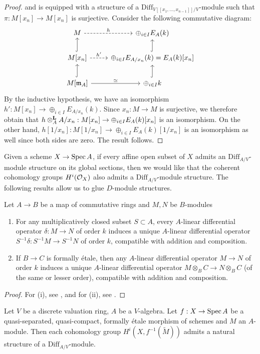 \begin{proof}
and is equipped with a structure of a $\mathrm{Diff}_{V[[x_1, \ldots, x_{n-1}]]/V}$-module such that $\pi: M[x_n] \to M[x_n]$ is surjective. Consider the following commutative diagram:
\[\begin{tikzcd}M \arrow[r, dashed, "h"] & \oplus_{i\in I} E_A(k) \\
M[x_n] \arrow[r, dashed, "h'"] \arrow[u, hook] & \oplus_{i \in I} E_{A/x_n}(k)=E_A(k)[x_n] \arrow[u, hook]\\
M[\ideal{m}_A] \arrow[r, "\simeq"] \arrow[u, hook] & \oplus_{i \in I} k \arrow[u, hook]
\end{tikzcd}\]
By the inductive hypothesis, we have an isomorphism $h': M[x_n] \to \oplus_{i \in I} E_{A/x_n}(k)$. Since $x_n: M \to M$ is surjective, we therefore
obtain that $h \otimesl_A A/x_n: M[x_n] \to \oplus_{i \in I} E_A(k)[x_n]$ is an isomorphism. On the other hand, $h[1/x_n]: M[1/x_n] \to \oplus_{i \in I} E_A(k)[1/x_n]$ is an isomorphism as well since both sides are zero. 
The result follows.
\end{proof}
Given a scheme $X \to \spec{A}$, if every affine open subset of $X$ admits an $\mathrm{Diff}_{A/V}$-module structure on its global sections,
then we would like that the coherent cohomology groups $H^i(\cal{O}_X)$ also admits a $\mathrm{Diff}_{A/V}$-module structure. The following
results allow us to glue $D$-module structures.
\begin{theorem}\label{thm:Dmodglue}
Let $A \to B$ be a map of commutative rings and $M,N$ be $B$-modules
\begin{enumerate}
\item[(i)] For any multiplicatively closed subset $S \subset A$, every $A$-linear differential operator $\delta: M \to N$ of order $k$ 
induces a unique $A$-linear differential operator $S^{-1}\delta: S^{-1}M \to S^{-1}N$ of order $k$, compatible with addition and composition.
\item[(ii)] If $B \to C$ is formally \'{e}tale, then any $A$-linear differential operator $M \to N$ of order $k$ induces a unique 
$A$-linear differential operator $M \otimes_B C \to N \otimes_B C$ (of the same or lesser order), compatible with addition and composition.
\end{enumerate}
\end{theorem}
\begin{proof}
For (i), see \cite[0G36]{sp}, and for (ii), see \cite[0H94]{sp}.
\end{proof}
\begin{corollary}\label{cor:dmodcoh}
Let $V$ be a discrete valuation ring, $A$ be a $V$-algebra. Let $f: X \to \spec{A}$ be a quasi-separated, quasi-compact, formally \'{e}tale  morphism of schemes
and $M$ an $A$-module.  Then each cohomology group $H^i(X, f^{-1}(\tilde{M}))$ admits a natural structure of a $\mathrm{Diff}_{A/V}$-module.
\end{corollary}

